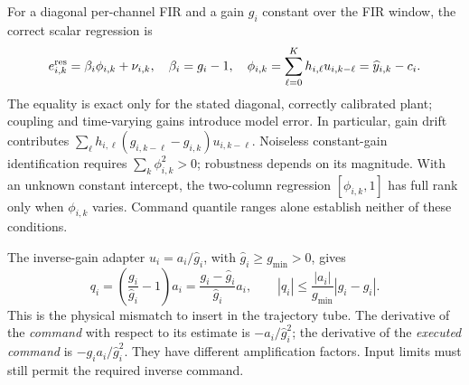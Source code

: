 For a diagonal per-channel FIR and a gain $g_i$ constant over the FIR window,
the correct scalar regression is
\begin{equation}
 e_{i,k}^{\rm res}=\beta_i\phi_{i,k}+\nu_{i,k},\quad
 \beta_i=g_i-1,\quad
 \phi_{i,k}=\sum_{\ell=0}^{K}h_{i,\ell}u_{i,k-\ell}
           =\widehat y_{i,k}-c_i.
 \label{eq:app-gain-regressor}
\end{equation}
The equality is exact only for the stated diagonal, correctly calibrated
plant; coupling and time-varying gains introduce model error. In particular,
gain drift contributes
$\sum_\ell h_{i,\ell}(g_{i,k-\ell}-g_{i,k})u_{i,k-\ell}$.
Noiseless constant-gain identification requires
$\sum_k\phi_{i,k}^2>0$; robustness depends on its magnitude. With an unknown
constant intercept, the two-column regression $[\phi_{i,k},1]$ has full rank
only when $\phi_{i,k}$ varies. Command quantile ranges alone establish neither
of these conditions.

The inverse-gain adapter $u_i=a_i/\widehat g_i$, with
$\widehat g_i\ge g_{\min}>0$, gives
\begin{equation}
 q_i=\left(\frac{g_i}{\widehat g_i}-1\right)a_i
     =\frac{g_i-\widehat g_i}{\widehat g_i}a_i,
 \qquad
 |q_i|\le\frac{|a_i|}{g_{\min}}|g_i-\widehat g_i|.
 \label{eq:app-gain-mismatch}
\end{equation}
This is the physical mismatch to insert in the trajectory tube. The derivative
of the \emph{command} with respect to its estimate is
$-a_i/\widehat g_i^2$; the derivative of the \emph{executed command} is
$-g_i a_i/\widehat g_i^2$. They have different amplification factors.
Input limits must still permit the required inverse command.

